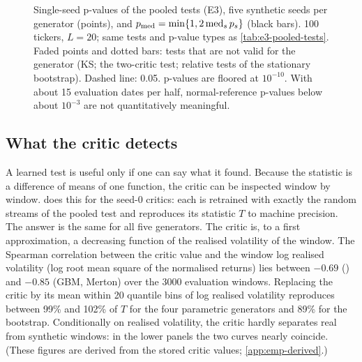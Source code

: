 \begin{figure}[tbp]
  \centering
  \caption{Single-seed p-values of the pooled tests (E3), five synthetic seeds per generator
    (points), and $p_{\mathrm{med}}=\min\{1,2\operatorname{med}_sp_s\}$ (black bars). 100 tickers, $L=20$; same tests and
    p-value types as \cref{tab:e3-pooled-tests}. Faded points and dotted bars: tests that are not
    valid for the generator (KS; the two-critic test; relative tests of the stationary
    bootstrap). Dashed line: 0.05. p-values are floored at $10^{-10}$. With about 15 evaluation
    dates per half, normal-reference p-values below about $10^{-3}$ are not quantitatively
    meaningful.}
  \label{fig:e3-pvalues}
\end{figure}

\subsection{What the critic detects}\label{sec:emp-witness}

A learned test is useful only if one can say what it found. Because the \WC{} statistic is a
difference of means of one function, the critic can be inspected window by window.
 does this for the seed-0 critics: each is retrained with exactly
the random streams of the pooled test and reproduces its statistic $T$ to machine precision. The
answer is the same for all five generators. The critic is, to a first approximation, a
decreasing function of the realised volatility of the window. The Spearman correlation between
the critic value and the window log realised volatility (log root mean square of the normalised
returns) lies between $-0.69$ (\GARCHt{}) and $-0.85$ (GBM, Merton) over the 3000 evaluation
windows. Replacing the critic by its mean within 20 quantile bins of log realised volatility
reproduces between 99\% and 102\% of $T$ for the four parametric generators and 89\% for the
bootstrap. Conditionally on realised volatility, the critic hardly separates real from
synthetic windows: in the lower panels the two curves nearly coincide. (These figures are derived
from the stored critic values; \cref{app:emp-derived}.)

